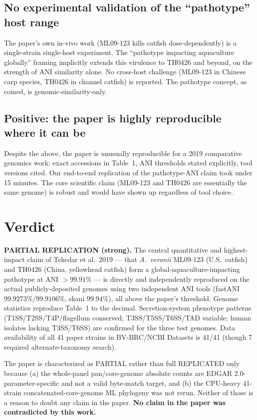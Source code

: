 \documentclass[11pt]{article}
\begin{document}
\subsection{No experimental validation of the ``pathotype'' host range}
The paper's own in-vivo work (ML09-123 kills catfish dose-dependently) is a
single-strain single-host experiment. The ``pathotype impacting aquaculture
globally'' framing implicitly extends this virulence to TH0426 and beyond, on
the strength of ANI similarity alone. No cross-host challenge (ML09-123 in
Chinese carp species, TH0426 in channel catfish) is reported. The pathotype
concept, as coined, is genomic-similarity-only.

\subsection{Positive: the paper is highly reproducible where it can be}
Despite the above, the paper is unusually reproducible for a 2019 comparative
genomics work: exact accessions in Table~1, ANI thresholds stated explicitly,
tool versions cited. Our end-to-end replication of the pathotype-ANI claim
took under 15 minutes. The core scientific claim (ML09-123 and TH0426 are
essentially the same genome) is robust and would have shown up regardless of
tool choice.

\section{Verdict}

\textbf{PARTIAL REPLICATION (strong).} The central quantitative and
highest-impact claim of Tekedar et al.\ 2019 --- that \emph{A.~veronii}
ML09-123 (U.S.\ catfish) and TH0426 (China, yellowhead catfish) form a
global-aquaculture-impacting pathotype at ANI $> 99.91\%$ --- is directly and
independently reproduced on the actual publicly-deposited genomes using two
independent ANI tools (fastANI $99.9273\%/99.9106\%$, skani $99.94\%$), all
above the paper's threshold. Genome statistics reproduce Table~1 to the
decimal. Secretion-system phenotype patterns (T1SS/T2SS/T4P/flagellum
conserved; T3SS/T5SS/T6SS/TAD variable; human isolates lacking T3SS/T6SS)
are confirmed for the three test genomes. Data availability of all 41 paper
strains in BV-BRC/NCBI Datasets is 41/41 (though 7 required alternate-taxonomy
search).

The paper is characterized as PARTIAL rather than full REPLICATED only because
(a) the whole-panel pan/core-genome absolute counts are EDGAR 2.0-parameter-specific
and not a valid byte-match target, and (b) the CPU-heavy 41-strain
concatenated-core-genome ML phylogeny was not rerun. Neither of those is a
reason to doubt any claim in the paper. \textbf{No claim in the paper was
contradicted by this work.}
\end{document}

